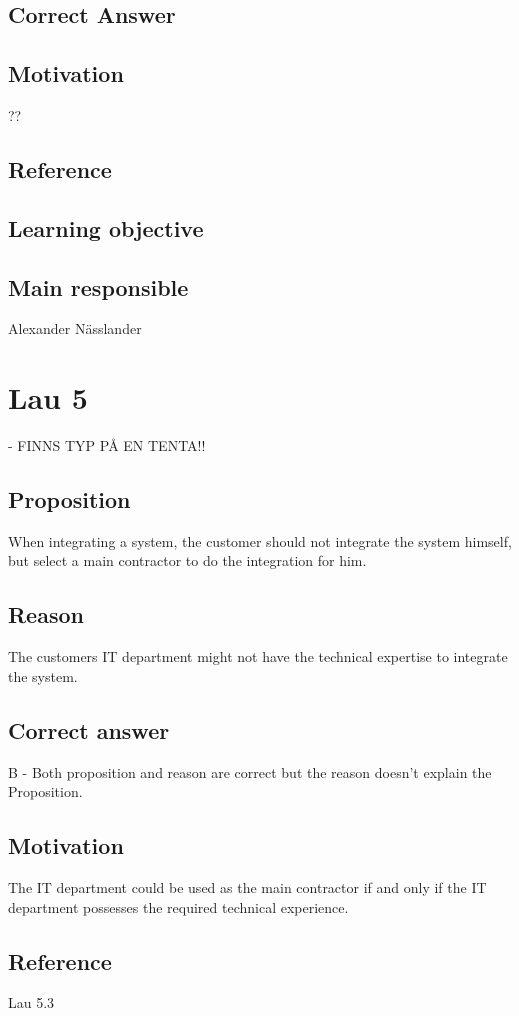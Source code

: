 \documentclass[a4paper]{article}
\begin{document}
\subsection*{Correct Answer}

\subsection*{Motivation}
 ??
\subsection*{Reference}

\subsection*{Learning objective}

\subsection*{Main responsible}
Alexander Nässlander


\section{Lau 5} - FINNS TYP PÅ EN TENTA!!
	\subsection{Proposition}
		When integrating a system, the customer should not integrate the system himself, but select a main contractor to do the integration for him.
	\subsection{Reason}
		The customers IT department might not have the technical expertise to integrate the system.
	\subsection{Correct answer}
		B - Both proposition and reason are correct but the reason doesn't explain the Proposition.
	\subsection{Motivation}
		The IT department could be used as the main contractor if and only if the IT department possesses the required technical experience.
	\subsection{Reference}
		Lau 5.3
\end{document}

